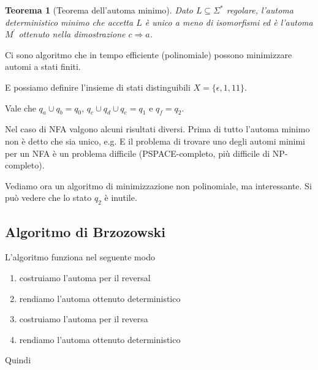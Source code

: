\documentclass[12pt]{article}
\newtheorem{teorema}{Teorema}
\begin{document}
\begin{teorema}[Teorema dell'automa minimo]
	Dato $L \subseteq \Sigma^*$ regolare, l'automa deterministico minimo che accetta $L$ è unico a meno di isomorfismi ed è l'automa $M^\prime$ ottenuto nella dimostrazione $c \Rightarrow a$.
\end{teorema}

\begin{tcolorbox}
	Ci sono algoritmo che in tempo efficiente (polinomiale) possono minimizzare automi a stati finiti.

	E possiamo definire l'insieme di stati distinguibili $X = \{\epsilon, 1, 11\}$.

	Vale che $q_a \cup q_b = q_0$, $q_c \cup q_d \cup q_e = q_1$ e $q_f = q_2$.
\end{tcolorbox}

Nel caso di NFA valgono alcuni risultati diversi.
Prima di tutto l'automa minimo non è detto che sia unico, e.g.
E il problema di trovare uno degli automi minimi per un NFA è un problema difficile (PSPACE-completo, più difficile di NP-completo).

Vediamo ora un algoritmo di minimizzazione non polinomiale, ma interessante.
Si può vedere che lo stato $q_2$ è inutile.

\subsection{Algoritmo di Brzozowski}
L'algoritmo funziona nel seguente modo
\begin{enumerate}
	\item costruiamo l'automa per il reversal
	\item rendiamo l'automa ottenuto deterministico
	\item costruiamo l'automa per il reversa
	\item rendiamo l'automa ottenuto deterministico
\end{enumerate}
Quindi
\end{document}
